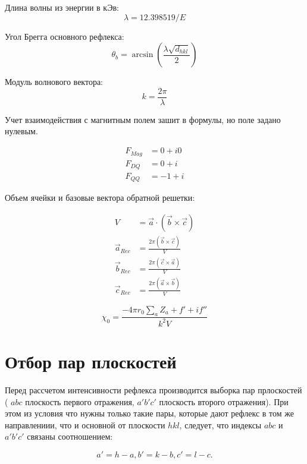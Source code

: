 \documentclass[12pt,a4paper,draft]{article}
\begin{document}
Длина волны из энергии в кЭв:
\begin{equation}
    \lambda = 12.398519 / E
\end{equation}

Угол Брегга основного рефлекса:
\begin{equation}
    \theta_b = \arcsin \left( \frac{\lambda \sqrt{d_{hkl} } }{2} \right)
\end{equation}

Модуль волнового вектора:
\begin{equation}
    k = \frac{2 \pi}{\lambda}
\end{equation}

Учет взаимодействия с магнитным полем зашит в формулы, но поле задано нулевым.

\begin{align}
    F_{Mag} &= 0 + i0 \\
    F_{DQ} &= 0 + i \\
    F_{QQ} &= -1 + i
\end{align}

Объем ячейки и базовые вектора обратной решетки:

\begin{align}
    V &= \vec{a} \cdot (\vec{b} \times \vec{c}) \\
    \vec{a}_{Rec} &= \frac{2 \pi (\vec{b} \times \vec{c})}{V} \\
    \vec{b}_{Rec} &= \frac{2 \pi (\vec{c} \times \vec{a})}{V} \\
    \vec{c}_{Rec} &= \frac{2 \pi (\vec{a} \times \vec{b})}{V}
\end{align}

\begin{equation}
    \chi_0 = \frac{-4 \pi r_0 \sum_{a} Z_a + f' + if''}{k^2 V}
\end{equation}

\section{Отбор пар плоскостей}

Перед рассчетом интенсивности рефлекса производится выборка
пар прлоскостей ( $abc$ плоскость первого отражения, $a'b'c'$
плоскость второго отражения). При этом из условия что нужны только такие пары,
которые дают рефлекс в том же направлениии, что и основной от плоскости $hkl$,
следует, что индексы $abc$ и $a'b'c'$ связаны соотношением:

\begin{equation}
    a' = h - a, b' = k - b, c' = l - c .
\end{equation}
\end{document}
